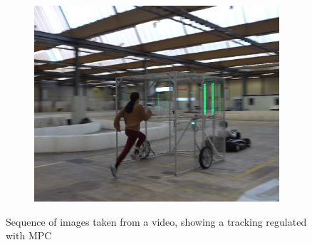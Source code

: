 \documentclass[a4paper,12pt,oneside]{book}
\begin{document}
\begin{figure}
\begin{subfigure}[b]{0.32\textwidth}
        \includegraphics[width=\textwidth]{SteadyState/ss9.png}
    \end{subfigure}
    \caption{Sequence of images taken from a video, showing a tracking regulated with MPC }
\label{MPC_hard_img2}
\end{figure}
\end{document}
